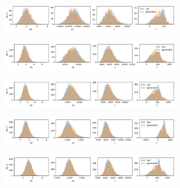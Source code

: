 \begin{figure}[H]
    \centering
\begin{subfigure}[b]{\textwidth}
    \centering
    \includegraphics[width=\linewidth]{figures/chapter4/surrogates/p3_histos_pre_0.png}
  \end{subfigure}
\begin{subfigure}[b]{\textwidth}
    \centering
    \includegraphics[width=\linewidth]{figures/chapter4/surrogates/p3_histos_pre_1.png}
  \end{subfigure}
\begin{subfigure}[b]{\textwidth}
    \centering
    \includegraphics[width=\linewidth]{figures/chapter4/surrogates/p3_histos_pre_2.png}
  \end{subfigure}
\begin{subfigure}[b]{\textwidth}
    \centering
    \includegraphics[width=\linewidth]{figures/chapter4/surrogates/p3_histos_pre_3.png}
  \end{subfigure}
\begin{subfigure}[b]{\textwidth}
    \centering
    \includegraphics[width=\linewidth]{figures/chapter4/surrogates/p3_histos_pre_4.png}

\end{subfigure}
\end{figure}
